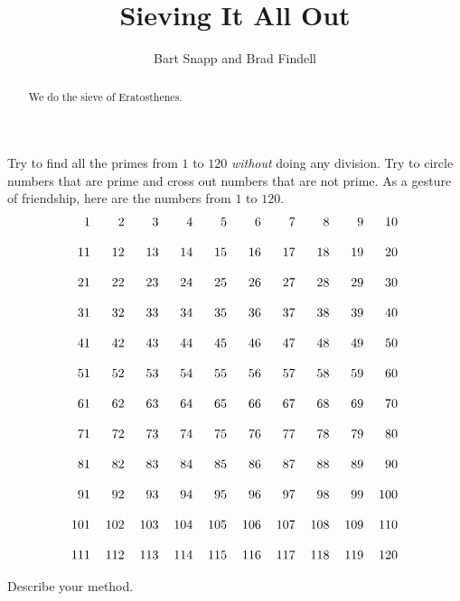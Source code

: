 \documentclass[nooutcomes]{ximera}
\title{Sieving It All Out}
\author{Bart Snapp and Brad Findell}
\begin{document}
\begin{abstract}
We do the sieve of Eratosthenes.
\end{abstract}
\maketitle

\label{A:Sieve}

\begin{problem} 
Try to find all the primes from $1$ to $120$ \textit{without}
doing any division.  Try to circle numbers that are prime and 
cross out numbers that are not prime.  
As a gesture of friendship, here are the numbers from $1$ to $120$.
\[
\begin{tabular}{r r r r r r r r r r}

  1 &   2 &   3 &   4 &   5 &   6 &   7 &   8 &   9 &  10\\
  \\
 11 &  12 &  13 &  14 &  15 &  16 &  17 &  18 &  19 &  20\\
 \\
 21 &  22 &  23 &  24 &  25 &  26 &  27 &  28 &  29 &  30\\
 \\
 31 &  32 &  33 &  34 &  35 &  36 &  37 &  38 &  39 &  40\\
 \\
 41 &  42 &  43 &  44 &  45 &  46 &  47 &  48 &  49 &  50\\
 \\
 51 &  52 &  53 &  54 &  55 &  56 &  57 &  58 &  59 &  60\\
 \\
 61 &  62 &  63 &  64 &  65 &  66 &  67 &  68 &  69 &  70\\
 \\
 71 &  72 &  73 &  74 &  75 &  76 &  77 &  78 &  79 &  80\\
 \\
 81 &  82 &  83 &  84 &  85 &  86 &  87 &  88 &  89 &  90\\
 \\
 91 &  92 &  93 &  94 &  95 &  96 &  97 &  98 &  99 & 100\\
 \\
101 & 102 & 103 & 104 & 105 & 106 & 107 & 108 & 109 & 110\\
\\
111 & 112 & 113 & 114 & 115 & 116 & 117 & 118 & 119 & 120\\
\end{tabular}
\]

Describe your method.  
\end{problem}
\end{document}
